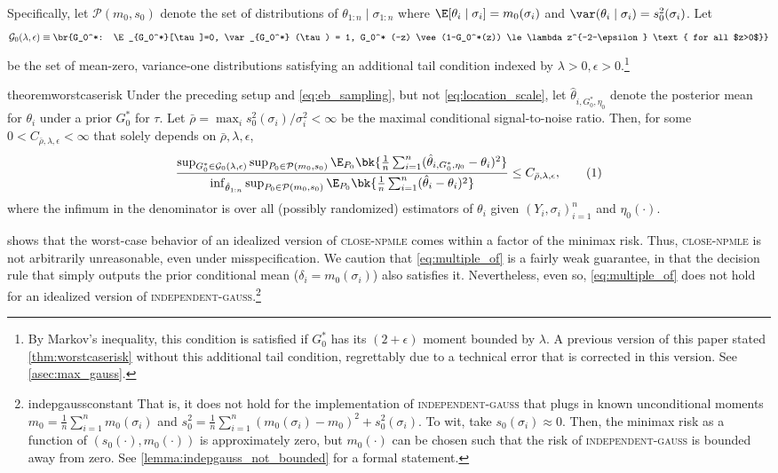 \documentclass[12pt, reqno]{amsart}
\newcommand\numberthis{\addtocounter{equation}{1}\tag{\theequation}}
\newcommand{\close}{\textsc{close}}
\newcommand{\npmle}{\textsc{npmle}}
\newcommand{\closenpmle}{\close-\npmle}
\newcommand{\indepgauss}{\textsc{independent-gauss}}
\numberwithin{equation}{section}
\begin{document}
Specifically, let $\mathcal P(m_0, s_0)$ denote
the set of distributions of $\theta_{1:n} \mid \sigma_{1:n}$ where $\E[\theta_i \mid
\sigma_i] = m_0(\sigma_i)$ and $\var(\theta_i \mid \sigma_i) = s_0^2(\sigma_i)$. Let
 \[\mathcal G_0(\lambda, \epsilon) \equiv \br{G_0^*: \E_{G_0^*}[\tau]=0, \var_{G_0^*}
 (\tau) = 1, G_0^* (-z) \vee (1-G_0^*(z))
\le \lambda z^{-2-\epsilon} \text{ for all $z>0$}} \]be the set of mean-zero, variance-one
 distributions satisfying an additional tail condition indexed by $\lambda > 0, \epsilon >
 0$.\footnote{By Markov's inequality, this condition is satisfied if $G_0^*$ has its $
 (2+\epsilon)$\th {} moment bounded by $\lambda$. A previous version of this paper stated
 \cref{thm:worstcaserisk} without this additional tail condition, regrettably due to a
 technical error that is corrected in this version. See \cref{asec:max_gauss}.}
\begin{restatable}{theorem}{worstcaserisk}
\label{thm:worstcaserisk}
  Under the preceding setup and \eqref{eq:eb_sampling}, but not \eqref{eq:location_scale},
  let $\hat \theta_ {i, G_0^*, \eta_0}$ denote the posterior mean for $\theta_i$ under a
  prior $G_0^*$
  for $\tau$. Let $\bar\rho =
  \max_i s_0^2 (\sigma_i) / \sigma_i^2 < \infty$ be the maximal conditional
   signal-to-noise ratio. Then, for some $0 < C_{\bar\rho, \lambda,
  \epsilon}
  <
  \infty$ that solely depends on $\bar\rho, \lambda, \epsilon$, \[
  \frac{\sup_{G_0^* \in \mathcal G_0(\lambda, \epsilon)}
\sup_{P_0 \in \mathcal P(m_0, s_0)} \E_{P_0}\bk{\frac{1}{n} \sum_{i=1}^n (\hat\theta_{i,
G_0^*, \eta_0} - \theta_i)^2}}{\inf_{\hat\theta_{1:n}} \sup_{P_0 \in \mathcal P(m_0, s_0)} \E_{P_0} \bk{\frac{1}{n}
\sum_{i=1}^n (\hat\theta_i - \theta_i)^2}} \le C_
 {\bar\rho, \lambda, \epsilon}, \numberthis 
\label{eq:multiple_of}
  \]
  where the infimum in the denominator is over all (possibly randomized)
  estimators of $\theta_i$ given $(Y_i, \sigma_i)_{i=1}^n$ and $\eta_0(\cdot)$.
\end{restatable}



 shows that the worst-case behavior of an idealized version of
\closenpmle{} comes within a factor of the minimax risk. Thus, \closenpmle{} is not
arbitrarily unreasonable, even under misspecification. We caution that
\eqref{eq:multiple_of} is a fairly weak guarantee, in that the decision rule that simply
outputs the prior conditional mean ($\delta_i = m_0 (\sigma_i)$) also satisfies it.
Nevertheless, even so,
\eqref{eq:multiple_of}
{does not} hold for an idealized version of \indepgauss.\footnote{\Copy
{indepgaussconstant} {That is, it does not hold for the implementation of \indepgauss{}
that plugs in known unconditional moments $m_0 =
\frac{1}{n} \sum_{i=1}^n m_0 (\sigma_i)$ and $s_0^2 = \frac{1}{n} \sum_{i=1}^n (m_0
(\sigma_i) - m_0)^2 + s_0^2 (\sigma_i)$. 
To wit, take $s_0
(\sigma_i) \approx 0$.
Then, the minimax risk as a function of $(s_0 (\cdot), m_0(\cdot))$ is approximately zero,
but $m_0(\cdot)$ can be chosen such that the risk of \indepgauss{} is bounded away from
zero.
See \cref{lemma:indepgauss_not_bounded} for a formal statement.}
} 
\end{document}
